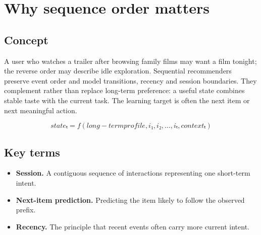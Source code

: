 \section{Why sequence order matters}

\begin{abstract}
The same events in a different order can describe a different intent.
\end{abstract}

\subsection{Concept}
A user who watches a trailer after browsing family films may want a film tonight; the reverse order may describe idle exploration. Sequential recommenders preserve event order and model transitions, recency and session boundaries. They complement rather than replace long-term preference: a useful state combines stable taste with the current task. The learning target is often the next item or next meaningful action.

\begin{equation*}
stateₜ = f(long-term profile, i₁, i₂, …, iₜ, contextₜ)
\end{equation*}

\subsection{Key terms}
\begin{itemize}
\item \textbf{Session.} A contiguous sequence of interactions representing one short-term intent.
\item \textbf{Next-item prediction.} Predicting the item likely to follow the observed prefix.
\item \textbf{Recency.} The principle that recent events often carry more current intent.
\end{itemize}
